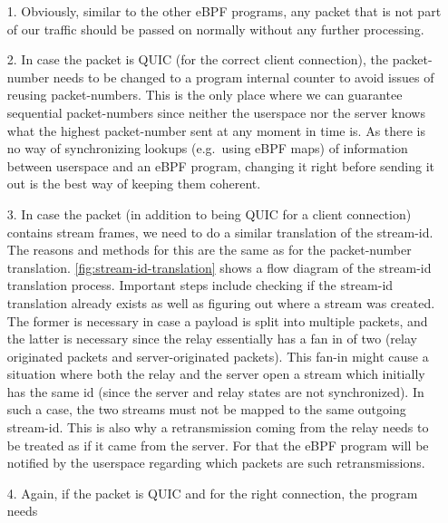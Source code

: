 \begin{enumerate}
    \item[1.]   Obviously, similar to the other eBPF programs, any packet that is not part of our traffic 
            should be passed on normally without any further processing.
    \item[2.] In case the packet is QUIC (for the correct client connection), the packet-number 
            needs to be changed to a program internal counter to avoid issues of reusing packet-numbers. 
            This is the only place where we can guarantee sequential packet-numbers since neither 
            the userspace nor the server knows what the highest packet-number sent at any moment in time is. 
            As there is no way of synchronizing lookups (e.g.~using eBPF maps) of information between userspace 
            and an eBPF program, changing it right before sending it out is the best way of keeping them coherent. 
    \item[3.] In case the packet (in addition to being QUIC for a client connection) contains 
                        stream frames, we need to do a similar translation of the stream-id.
                        The reasons and methods for this are the same as for the packet-number translation.
                        \autoref{fig:stream-id-translation} shows a flow diagram of the stream-id translation
                        process.
                        Important steps include checking if the stream-id translation already exists as well
                        as figuring out where a stream was created.
                        The former is necessary in case a payload is split into multiple packets, and the latter is 
                        necessary since the relay essentially has a fan in of two (relay originated packets and 
                        server-originated packets).
                        This fan-in might cause a situation where both the relay and the server open a stream which 
                        initially has the same id (since the server and relay states are not synchronized).
                        In such a case, the two streams must not be mapped to the same outgoing stream-id.  
                        This is also why a retransmission coming from the relay needs to be treated as 
                        if it came from the server. For that the eBPF program will be notified by the userspace 
                        regarding which packets are such retransmissions.
    \item[4.] Again, if the packet is QUIC and for the right connection, the program needs 

\end{enumerate}

